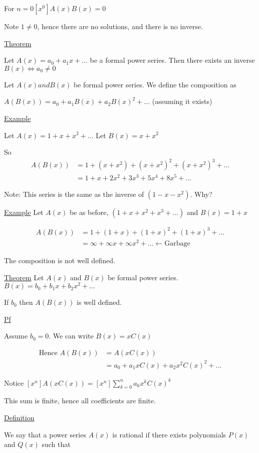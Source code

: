 \documentclass{article}
\begin{document}
For $n=0 [x^0]A(x)B(x)=0$

Note $1 \ne 0$, hence there are no solutions, and there is no inverse. 

\underline{Theorem}

Let $A(x) = a_0 + a_1x + \ldots$ be a formal power series. Then there exists an inverse $B(x) \iff a_0 \ne 0$

Let $A(x) and B(x)$ be formal power series. We define the composition as 

$A(B(x)) = a_0 + a_1B(x) + a_2B(x)^2+\ldots$ (assuming it exists)

\underline{Example}

Let $A(x) = 1+x+x^2+\ldots$
Let $B(x) = x+x^2$

So 
\begin{align*}
A(B(x)) &= 1+(x+x^2)+(x+x^2)^2 + (x+x^2)^3+\ldots\\
&= 1+x+2x^2+3x^3+5x^4+8x^5+\ldots
\end{align*}

Note: This series is the same as the inverse of $(1-x-x^2)$. Why?

\underline{Example} Let $A(x)$ be as before, $(1+x+x^2+x^3+\ldots)$ and $B(x) = 1+x$

\begin{align*}
    A(B(x)) &= 1 + (1+x) + (1+x)^2 + (1+x)^3 + \ldots \\
    &= \infty + \infty x + \infty x^2 + \ldots \leftarrow \text{Garbage}
\end{align*}

The composition is not well defined. 

\underline{Theorem} Let $A(x)$ and $B(x)$ be formal power series. $B(x)=b_0+b_1x+b_2x^2+\ldots$

If $b_0$ then $A(B(x))$ is well defined. 

\underline{Pf}

Assume $b_0=0$. We can write $B(x)=xC(x)$

\begin{align*}
\text{Hence } A(B(x)) &= A(xC(x))\\
&= a_0 + a_1xC(x) + a_2x^2C(x)^2 + \ldots
\end{align*}

Notice $[x^n]A(xC(x)) = [x^n]\sum_{k=0}^{n}a_kx^kC(x)^k$

This sum is finite, hence all coefficients are finite. 

\underline{Definition}

We say that a power series $A(x)$ is rational if there exists polynomials $P(x)$ and $Q(x)$ such that
\end{document}
